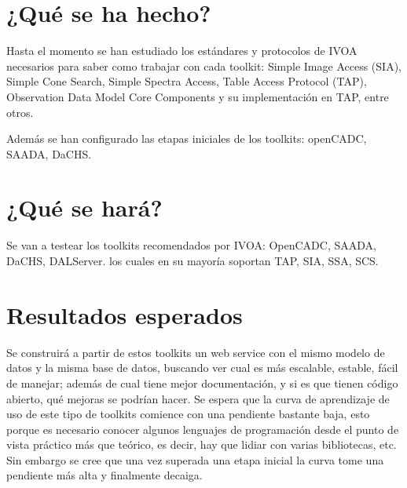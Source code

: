 \section{¿Qué se ha hecho?}

Hasta el momento se han estudiado los estándares y protocolos de IVOA
necesarios para saber como trabajar con cada toolkit: Simple Image Access (SIA),
Simple Cone Search, Simple Spectra Access, Table Access Protocol (TAP), Observation
Data Model Core Components \cite{obscore} y su implementación en TAP, entre otros.

Además se han configurado las etapas iniciales de los toolkits: openCADC,
SAADA, DaCHS.

\section{¿Qué se hará?}

Se van a testear los toolkits recomendados por IVOA: OpenCADC, SAADA, DaCHS,
DALServer. los cuales en su mayoría soportan TAP, SIA, SSA, SCS.

\section{Resultados esperados}

Se construirá a partir de estos toolkits un web service con el mismo modelo de
datos y la misma base de datos, buscando ver cual es más escalable, estable, fácil
de manejar; además de cual tiene mejor documentación, y si es que tienen código
abierto, qué mejoras se podrían hacer. Se espera que la curva de aprendizaje de
uso de este tipo de toolkits comience con una pendiente bastante baja, esto
porque es necesario conocer algunos lenguajes de programación desde el punto de
vista práctico más que teórico, es decir, hay que lidiar con varias
bibliotecas, etc. Sin embargo se cree que una vez superada una etapa inicial la
curva tome una pendiente más alta y finalmente decaiga.

